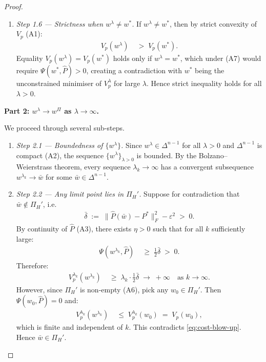 \documentclass[12pt,openany]{book}
\newcommand{\bfw}{\mathbf{w}}
\numberwithin{equation}{chapter}
\theoremstyle{plain}
\theoremstyle{definition}
\theoremstyle{remark}
\def\bfw{w}%
\begin{document}
\begin{proof}
\begin{enumerate}
  \item \emph{Step 1.6 — Strictness when $\bfw^\lambda \neq \bfw^*$.}
        If $\bfw^\lambda \neq \bfw^*$, then by strict convexity of
        $V_p$ (A1):
        \begin{align}
          V_p(\bfw^\lambda) &\;>\; V_p(\bfw^*).
          \label{eq:strict-lb}
        \end{align}
        Equality $V_p(\bfw^\lambda) = V_p(\bfw^*)$ holds only if
        $\bfw^\lambda = \bfw^*$, which under (A7) would require
        $\Psi(\bfw^*,\hat{P}) > 0$, creating a contradiction with
        $\bfw^*$ being the unconstrained minimiser of $V_p^\lambda$
        for large $\lambda$.  Hence strict inequality holds for all
        $\lambda > 0$.
\end{enumerate}

\medskip
\noindent\textbf{Part 2: $\bfw^\lambda \to \bfw^{\Pi}$ as
$\lambda \to \infty$.}

We proceed through several sub-steps.
\begin{enumerate}
  \item \emph{Step 2.1 — Boundedness of $\{\bfw^\lambda\}$.}
        Since $\bfw^\lambda \in \Delta^{n-1}$ for all $\lambda > 0$
        and $\Delta^{n-1}$ is compact (A2), the sequence
        $\{\bfw^\lambda\}_{\lambda > 0}$ is bounded.  By the
        Bolzano--Weierstrass theorem, every sequence
        $\lambda_k \to \infty$ has a convergent subsequence
        $\bfw^{\lambda_k} \to \bar\bfw$ for some
        $\bar\bfw \in \Delta^{n-1}$.

  \item \emph{Step 2.2 — Any limit point lies in $\Pi_H'$.}
        Suppose for contradiction that $\bar\bfw \notin \Pi_H'$, i.e.\
        \begin{align}
          \bar\delta \;:=\;
          \|\hat{P}(\bar\bfw) - P^*\|_F^2 - \varepsilon^2
          \;>\; 0.
          \label{eq:bar-violation}
        \end{align}
        By continuity of $\hat{P}$ (A3), there exists $\eta > 0$
        such that for all $k$ sufficiently large:
        \begin{align}
          \Psi(\bfw^{\lambda_k}, \hat{P})
          &\;\geq\; \tfrac{1}{2}\bar\delta \;>\; 0.
          \label{eq:psi-lb-k}
        \end{align}
        Therefore:
        \begin{align}
          V_p^{\lambda_k}(\bfw^{\lambda_k})
          &\;\geq\; \lambda_k \cdot \tfrac{1}{2}\bar\delta
          \;\to\; +\infty \quad \text{as } k \to \infty.
          \label{eq:cost-blow-up}
        \end{align}
        However, since $\Pi_H'$ is non-empty (A6), pick any
        $\bfw_0 \in \Pi_H'$.  Then
        $\Psi(\bfw_0,\hat{P}) = 0$ and:
        \begin{align}
          V_p^{\lambda_k}(\bfw^{\lambda_k})
          &\;\leq\; V_p^{\lambda_k}(\bfw_0)
          \;=\; V_p(\bfw_0),
          \label{eq:cost-ub}
        \end{align}
        which is finite and independent of $k$.  This contradicts
        \eqref{eq:cost-blow-up}.  Hence $\bar\bfw \in \Pi_H'$.


\end{enumerate}
\end{proof}
\end{document}
